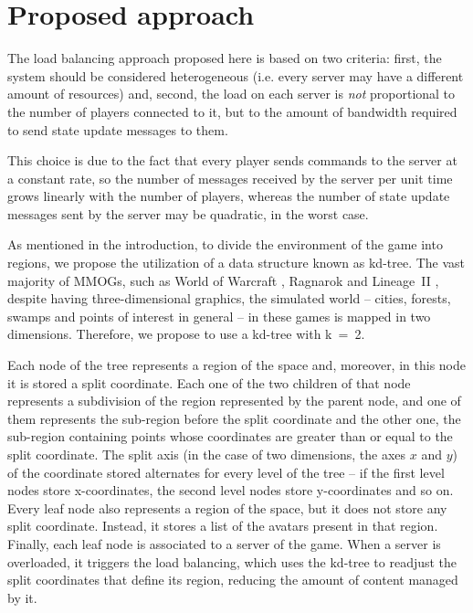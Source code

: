 \documentclass[acmtocl]{acmtrans2m}
\begin{document}
\section{Proposed approach}
\label{sec:proposal}

The load balancing approach proposed here is based on two criteria: first, the system should be considered heterogeneous (i.e. every server may have a different amount of resources) and, second, the load on each server is \emph{not} proportional to the number of players connected to it, but to the amount of bandwidth required to send state update messages to them.

This choice is due to the fact that every player sends commands to the server at a constant rate, so the number of messages received by the server per unit time grows linearly with the number of players, whereas the number of state update messages sent by the server may be quadratic, in the worst case.

As mentioned in the introduction, to divide the environment of the game into regions, we propose the utilization of a data structure known as kd-tree. The vast majority of MMOGs, such as World of Warcraft \cite{worldofwarcraft}, Ragnarok \cite{ragnarok} and \mbox{Lineage II} \cite{lineage2}, despite having three-dimensional graphics, the simulated world -- cities, forests, swamps and points of interest in general -- in these games is mapped in two dimensions. Therefore, we propose to use a kd-tree with \mbox{k = 2}.

Each node of the tree represents a region of the space and, moreover, in this node it is stored a split coordinate. Each one of the two children of that node represents a subdivision of the region represented by the parent node, and one of them represents the sub-region before the split coordinate and the other one, the sub-region containing points whose coordinates are greater than or equal to the split coordinate. The split axis (in the case of two dimensions, the axes $x$ and $y$) of the coordinate stored alternates for every level of the tree -- if the first level nodes store x-coordinates, the second level nodes store y-coordinates and so on. Every leaf node also represents a region of the space, but it does not store any split coordinate. Instead, it stores a list of the avatars present in that region. Finally, each leaf node is associated to a server of the game. When a server is overloaded, it triggers the load balancing, which uses the kd-tree to readjust the split coordinates that define its region, reducing the amount of content managed by it.
\end{document}
